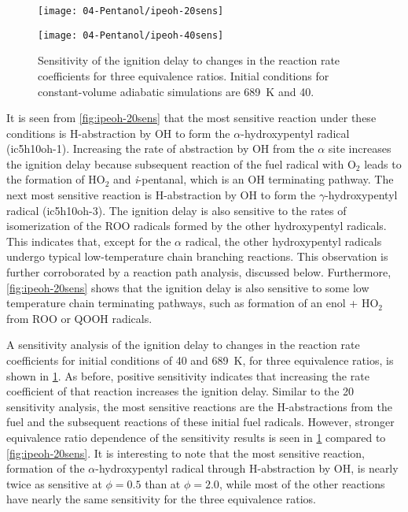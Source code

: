 \documentclass[../main.tex]{subfiles}
\begin{document}
\begin{figure}
    \ffigbox
        {\texttt{[image: 04-Pentanol/ipeoh-20sens]}}
        {\caption{Sensitivity of the ignition delay to changes in
        the reaction rate coefficients for three equivalence ratios.
        Initial conditions for constant-volume adiabatic simulations are
        \SI{800}{\kelvin} and \SI{20}{\atmosphere}.}
        \label{fig:ipeoh-20sens}}
    \par
    \vspace{10pt}
    \ffigbox
        {\texttt{[image: 04-Pentanol/ipeoh-40sens]}}
        {\caption{Sensitivity of the ignition delay to changes in
        the reaction rate coefficients for three equivalence ratios.
        Initial conditions for constant-volume adiabatic simulations are
        \SI{689}{\kelvin} and \SI{40}{\atmosphere}.}
        \label{fig:ipeoh-40sens}}
\end{figure}

It is seen from \cref{fig:ipeoh-20sens} that the most sensitive reaction
under these conditions is H-abstraction by OH to form the $\alpha$-hydroxypentyl
radical (ic5h10oh-1). Increasing the rate of abstraction by OH from the
$\alpha$ site increases the ignition delay because subsequent reaction
of the fuel radical with O$_2$ leads to the formation of HO$_2$ and
\textit{i}-pentanal, which is an OH terminating pathway. The next most
sensitive reaction is H-abstraction by OH to form the $\gamma$-hydroxypentyl
radical (ic5h10oh-3). The ignition delay is also sensitive to the rates of
isomerization of the ROO radicals formed by the other hydroxypentyl
radicals. This indicates that, except for the $\alpha$ radical, the
other hydroxypentyl radicals undergo typical low-temperature chain branching
reactions. This observation is further corroborated by a reaction path
analysis, discussed below. Furthermore, \cref{fig:ipeoh-20sens} shows that
the ignition delay is also sensitive to some low temperature chain
terminating pathways, such as formation of an enol + HO$_2$ from ROO
or QOOH radicals.

A sensitivity analysis of the ignition delay to changes in the
reaction rate coefficients for initial conditions of \SI{40}{\atmosphere}
and \SI{689}{\kelvin}, for three equivalence ratios, is shown in
\cref{fig:ipeoh-40sens}. As before, positive sensitivity indicates
that increasing the rate coefficient of that reaction increases the
ignition delay. Similar to the \SI{20}{\atmosphere} sensitivity analysis,
the most sensitive reactions are the H-abstractions from the fuel and
the subsequent reactions of these initial fuel radicals. However,
stronger equivalence ratio dependence of the sensitivity results is
seen in \cref{fig:ipeoh-40sens} compared to \cref{fig:ipeoh-20sens}.
It is interesting to note that the most sensitive reaction, formation
of the $\alpha$-hydroxypentyl radical through H-abstraction by
OH, is nearly twice as sensitive at $\phi=0.5$ than at $\phi=2.0$, while
most of the other reactions have nearly the same sensitivity for
the three equivalence ratios.
\end{document}
